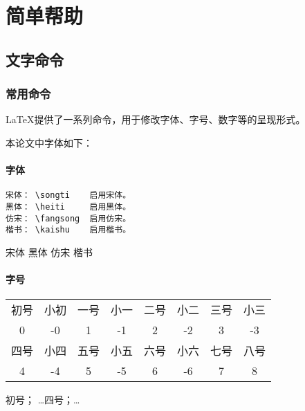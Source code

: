 
\chapter{简单帮助}
\section{文字命令}
\subsection{常用命令}
\LaTeX 提供了一系列命令，用于修改字体、字号、数字等的呈现形式。

本论文中字体如下：
\subsubsection{字体}
\begin{verbatim}
宋体： \songti    启用宋体。
黑体： \heiti     启用黑体。
仿宋： \fangsong  启用仿宋。
楷书： \kaishu    启用楷书。
\end{verbatim}
{\songti 宋体} {\heiti 黑体}    {\fangsong 仿宋}     {\kaishu 楷书}
\subsubsection{字号}%
\begin{center}
	\begin{tabular}{cccccccc}
		\toprule
		初号 & 小初 & 一号 & 小一 & 二号 & 小二 & 三号 & 小三 \\
		0 & -0 & 1 & -1 & 2 & -2 & 3 & -3 \\
		\hline
		四号 & 小四 & 五号 & 小五 & 六号 & 小六 & 七号 & 八号 \\
		4 & -4 & 5 & -5 & 6 & -6 & 7 & 8 \\
		\bottomrule
	\end{tabular}
\end{center}
{初号}； \dots {四号}；\dots {}